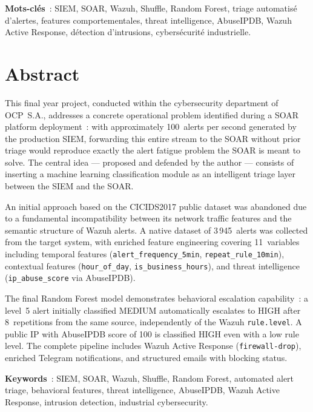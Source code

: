 \documentclass[12pt,a4paper]{report}
\begin{document}
\textbf{Mots-clés}~: SIEM, SOAR, Wazuh, Shuffle, Random Forest, triage automatisé d'alertes, features comportementales, threat intelligence, AbuseIPDB, Wazuh Active Response, détection d'intrusions, cybersécurité industrielle.

\vspace{0.8cm}
\chapter*{Abstract}

This final year project, conducted within the cybersecurity department of OCP~S.A., addresses a concrete operational problem identified during a SOAR platform deployment~: with approximately 100~alerts per second generated by the production SIEM, forwarding this entire stream to the SOAR without prior triage would reproduce exactly the alert fatigue problem the SOAR is meant to solve. The central idea — proposed and defended by the author — consists of inserting a machine learning classification module as an intelligent triage layer between the SIEM and the SOAR.

An initial approach based on the CICIDS2017 public dataset was abandoned due to a fundamental incompatibility between its network traffic features and the semantic structure of Wazuh alerts. A native dataset of 3\,945~alerts was collected from the target system, with enriched feature engineering covering 11~variables including temporal features (\texttt{alert\_frequency\_5min}, \texttt{repeat\_rule\_10min}), contextual features (\texttt{hour\_of\_day}, \texttt{is\_business\_hours}), and threat intelligence (\texttt{ip\_abuse\_score} via AbuseIPDB).

The final Random Forest model demonstrates behavioral escalation capability~: a level~5 alert initially classified MEDIUM automatically escalates to HIGH after 8~repetitions from the same source, independently of the Wazuh \texttt{rule.level}. A public IP with AbuseIPDB score of 100 is classified HIGH even with a low rule level. The complete pipeline includes Wazuh Active Response (\texttt{firewall-drop}), enriched Telegram notifications, and structured emails with blocking status.

\textbf{Keywords}~: SIEM, SOAR, Wazuh, Shuffle, Random Forest, automated alert triage, behavioral features, threat intelligence, AbuseIPDB, Wazuh Active Response, intrusion detection, industrial cybersecurity.

\newpage
\end{document}
